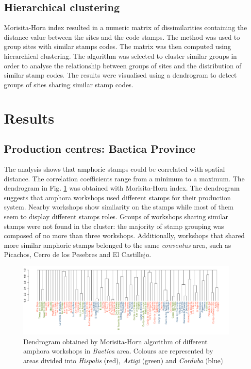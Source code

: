 \documentclass[review]{elsarticle}
\newcommand{\memo}[2]{\textcolor{#1}{#2}}
\newcommand{\xavi}[1]{\memo{magenta}{XRC: #1\\}}
\begin{document}
\subsection{Hierarchical clustering}

Morisita-Horn index resulted in a numeric matrix of dissimilarities containing the distance value between the sites and the code stamps. The method was used to group sites with similar stamps codes. The matrix was then computed using hierarchical clustering. The algorithm was selected to cluster similar groups in order to analyse the relationship between groups of sites and the distribution of similar stamp codes. The results were visualised using a dendrogram to detect groups of sites sharing similar stamp codes.  




\section{Results}

\subsection{Production centres: Baetica Province}

The analysis shows that amphoric stamps could be correlated with spatial distance. The correlation coefficients range from a minimum to a maximum. The dendrogram in Fig. \ref{dendro} was obtained with Morisita-Horn index. The dendrogram suggests that amphora workshops used different stamps for their production system. Nearby workshops show similarity on the stamps while most of them seem to display different stamps roles. Groups of workshops sharing similar stamps were not found in the cluster: the majority of stamp grouping was composed of no more than three workshops. Additionally, workshops that shared more similar amphoric stamps belonged to the same \textit{conventus} area, such as Picachos, Cerro de los Pesebres and El Castillejo. 

\begin{figure}
	\centering
\includegraphics[width=\linewidth]{figs/dendro}
\caption{Dendrogram obtained by Morisita-Horn algorithm of different amphora workshops in \textit{Baetica} area. Colours are represented by areas divided into \textit{Hispalis} (red), \textit{Astigi} (green) and \textit{Corduba} (blue)}
\label{dendro}
\end{figure} 
\end{document}
